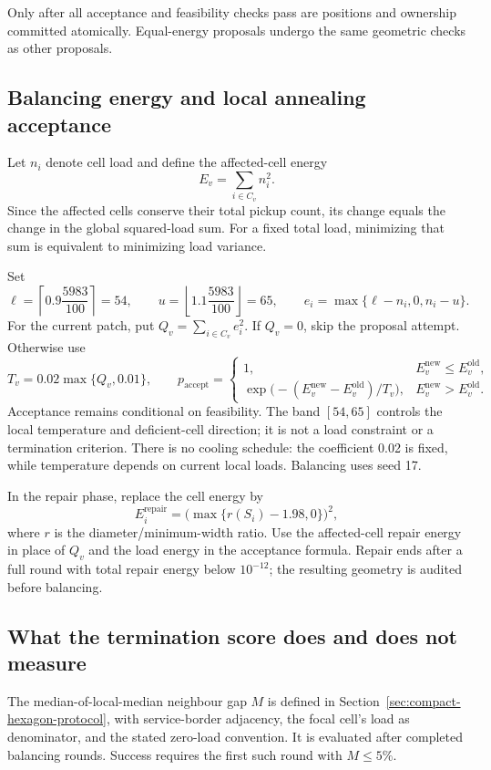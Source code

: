 \documentclass[11pt]{article}
\begin{document}
Only after all acceptance and feasibility checks pass are positions and
ownership committed atomically. Equal-energy proposals undergo the same
geometric checks as other proposals.

\subsection{Balancing energy and local annealing acceptance}
Let $n_i$ denote cell load and define the affected-cell energy
\[
 E_v=\sum_{i\in C_v}n_i^2.
\]
Since the affected cells conserve their total pickup count, its change
equals the change in the global squared-load sum. For a fixed total load,
minimizing that sum is equivalent to minimizing load variance.

Set
\[
 \ell=\left\lceil0.9\frac{5983}{100}\right\rceil=54,
 \qquad u=\left\lfloor1.1\frac{5983}{100}\right\rfloor=65,
 \qquad e_i=\max\{\ell-n_i,0,n_i-u\}.
\]
For the current patch, put $Q_v=\sum_{i\in C_v}e_i^2$. If $Q_v=0$, skip
the proposal attempt. Otherwise use
\[
 T_v=0.02\max\{Q_v,0.01\},\qquad
 p_{\mathrm{accept}}=
 \begin{cases}
  1,& E_v^{\mathrm{new}}\le E_v^{\mathrm{old}},\\
  \exp\bigl(-(E_v^{\mathrm{new}}-E_v^{\mathrm{old}})/T_v\bigr),
     & E_v^{\mathrm{new}}>E_v^{\mathrm{old}}.
 \end{cases}
\]
Acceptance remains conditional on feasibility. The band $[54,65]$ controls
the local temperature and deficient-cell direction; it is not a load
constraint or a termination criterion. There is no cooling schedule:
the coefficient 0.02 is fixed, while temperature depends on current local
loads. Balancing uses seed 17.

In the repair phase, replace the cell energy by
\[
 E_i^{\mathrm{repair}}=
 \bigl(\max\{r(S_i)-1.98,0\}\bigr)^2,
\]
where $r$ is the diameter/minimum-width ratio. Use the affected-cell repair
energy in place of $Q_v$ and the load energy in the acceptance formula.
Repair ends after a full round with total repair energy below $10^{-12}$;
the resulting geometry is audited before balancing.

\subsection{What the termination score does and does not measure}
The median-of-local-median neighbour gap $M$ is defined in
Section~\ref{sec:compact-hexagon-protocol}, with service-border adjacency,
the focal cell's load as denominator, and the stated zero-load convention.
It is evaluated after completed balancing rounds. Success requires the
first such round with $M\le5\%$.
\end{document}
